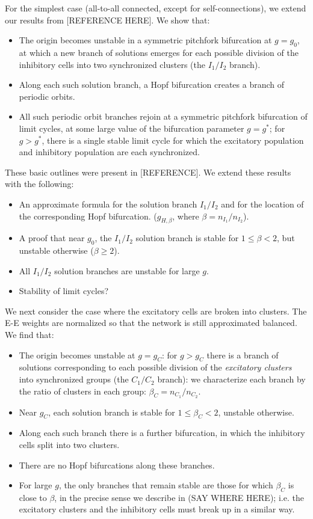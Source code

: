 \documentclass[reqno]{siamonline190516}
\begin{document}
For the simplest case (all-to-all connected, except for self-connections), we extend our results from [REFERENCE HERE]. We show that:
\begin{itemize}
    \item The origin becomes unstable in a symmetric pitchfork bifurcation at $g=g_0$, at which a new branch of solutions emerges for each possible division of the inhibitory cells into two synchronized clusters (the $I_1/I_2$ branch).
    \item Along each such solution branch, a Hopf bifurcation creates a branch of periodic orbits.
    \item All such periodic orbit branches rejoin at a symmetric pitchfork bifurcation of limit cycles, at some large value of the bifurcation parameter $g=g^*$; for $g>g^*$, there is a single stable limit cycle for which the excitatory population and inhibitory population are each synchronized.
\end{itemize}
These basic outlines were present in [REFERENCE]. We extend these results with the following:
\begin{itemize}
    \item An approximate formula for the solution branch $I_1/I_2$ and for the location of the corresponding Hopf bifurcation. ($g_{H,\beta}$, where $\beta = n_{I_1}/n_{I_2}$).
    \item A proof that near $g_0$, the $I_1/I_2$ solution branch is stable for $1\leq \beta < 2$, but unstable otherwise ($\beta \ge 2$).
    \item All $I_1/I_2$ solution branches are unstable for large $g$.
    \item Stability of limit cycles?
\end{itemize}

We next consider the case where the excitatory cells are broken into clusters. The E-E weights are normalized so that the network is still approximated balanced. We find that:
\begin{itemize}
\item The origin becomes unstable at $g=g_C$: for $g>g_C$ there is a branch of solutions corresponding to each possible division of the \emph{excitatory clusters} into synchronized groups (the $C_1/C_2$ branch): we characterize each branch by the ratio of clusters in each group: $\beta_C = n_{C_1}/n_{C_2}$.
\item Near $g_C$, each solution branch is stable for  $1 \le \beta_C < 2$, unstable otherwise.
\item Along each such branch there is a further bifurcation, in which the inhibitory cells split into two clusters.
\item There are no Hopf bifurcations along these branches.
\item For large $g$, the only branches that remain stable are those for which $\beta_C$ is close to $\beta$, in the precise sense we describe in (SAY WHERE HERE); i.e. the excitatory clusters and the inhibitory cells must break up in a similar way.
\end{itemize}
\end{document}
